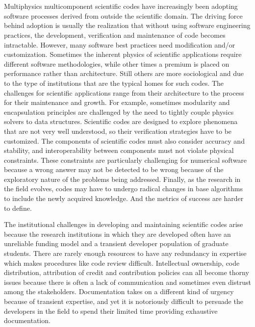 \documentclass[11pt]{article}
\begin{document}
\\ \\
Multiphysics multicomponent scientific codes have increasingly been
adopting software processes derived from outside the scientific
domain. The driving force behind adoption is usually the realization
that without using software engineering practices, the development,
verification and maintenance of code becomes intractable. However,
many software best practices need modification and/or customization.  Sometimes the inherent physics of scientific applications require different software methodologies, while other times a premium is placed on performance rather than architecture.  Still others are more sociological and due to the
type of institutions that are the typical homes for such codes. The
challenges for scientific applications range from their architecture to the process for their
maintenance and growth. For example, sometimes modularity and
encapsulation principles are challenged by the need to tightly couple physics solvers to data structures.  Scientific codes are
designed to explore phenomena that are not very well understood, so
their verification strategies have to be customized. The
components of scientific codes must also consider accuracy and stability, and
interoperability between components must not
violate physical constraints. These constraints are particularly challenging for
numerical software because a wrong answer may not be detected to be wrong
because of the exploratory nature of the problems being addressed.  Finally, as
the research in the field evolves, codes may have to undergo radical
changes in base algorithms to include the newly acquired knowledge. And
the metrics of success are harder to define. 

The institutional challenges in developing and maintaining scientific codes arise because the 
research institutions in which they are developed often have an unreliable
funding model and a transient developer population of graduate students. There are
rarely enough resources  to have any redundancy in expertise which makes
procedures like code review difficult. Intellectual ownership, code
distribution, attribution of credit and contribution policies can all
become thorny issues because there is often a lack of communication
and sometimes even distrust among the stakeholders. Documentation
takes on a different kind of urgency because of transient expertise,
and yet it is notoriously difficult to persuade the 
developers in the field to spend their limited time providing
exhaustive documentation. 
\end{document}
